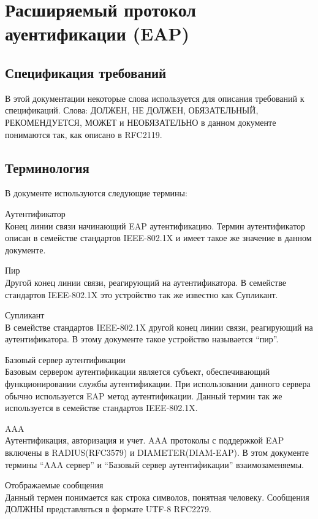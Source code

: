 \section{Расширяемый протокол ауентификации (EAP)} 

\subsection{Спецификация требований}

В этой документации некоторые слова используется для описания требований к спецификаций. Слова: ДОЛЖЕН, НЕ ДОЛЖЕН, ОБЯЗАТЕЛЬНЫЙ, РЕКОМЕНДУЕТСЯ, МОЖЕТ и НЕОБЯЗАТЕЛЬНО в данном документе понимаются так, как описано в RFC2119.

\subsection{Терминология}

В документе используются следующие термины:

Аутентификатор \\ Конец линии связи начинающий EAP аутентификацию. Термин аутентификатор описан в семействе стандартов IEEE-802.1X и имеет такое же значение в данном документе.

Пир \\ Другой конец линии связи, реагирующий на аутентификатора. В семействе стандартов IEEE-802.1X это устройство так же известно как Супликант.

Супликант \\  В семействе стандартов IEEE-802.1X другой конец линии связи, реагирующий на аутентификатора. В этому документе такое устройство называется ``пир''.

Базовый сервер аутентификации \\ Базовым сервером аутентификации является субъект, обеспечивающий функционировании службы аутентификации. При использовании данного сервера обычно используется EAP метод аутентификации. Данный термин так же используется в семействе стандартов IEEE-802.1X.

AAA \\ Аутентификация, авторизация и учет. AAA протоколы с поддержкой EAP включены в RADIUS(RFC3579) и DIAMETER(DIAM-EAP). В этом документе термины ``AAA сервер'' и ``Базовый сервер аутентификации'' взаимозаменяемы.

Отображаемые сообщения \\ Данный термен понимается как строка символов, понятная человеку. Сообщения ДОЛЖНЫ представляться в формате UTF-8 RFC2279.

